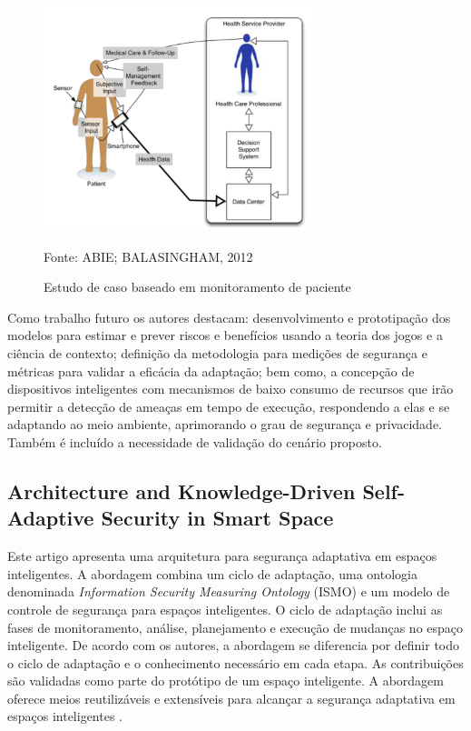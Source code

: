 \documentclass[tid,table]{texufpel} %
\begin{document}
\begin{figure}[ht]
\centering
\includegraphics[width=0.7\textwidth]{imagens/case-study-patient-monitoring.png}
\caption{Estudo de caso baseado em monitoramento de paciente}
\label{case-study-patient-monitoring}
Fonte: ABIE; BALASINGHAM, 2012
\end{figure}


Como trabalho futuro os autores destacam: desenvolvimento e prototipação dos modelos para estimar e prever riscos e benefícios usando a teoria dos jogos e a ciência de contexto; definição da metodologia para medições de segurança e métricas para validar a eficácia da adaptação; bem como, a concepção de dispositivos inteligentes com mecanismos de baixo consumo de recursos que irão permitir a detecção de ameaças em tempo de execução, respondendo a elas e se adaptando ao meio ambiente, aprimorando o grau de segurança e privacidade. Também é incluído a necessidade de validação do cenário proposto.



\subsection{Architecture and Knowledge-Driven Self-Adaptive Security in Smart Space} %

Este artigo apresenta uma arquitetura para segurança adaptativa em espaços inteligentes. A abordagem combina um ciclo de adaptação, uma ontologia denominada \textit{Information Security Measuring Ontology} (ISMO) e um modelo de controle de segurança para espaços inteligentes. O ciclo de adaptação inclui as fases de monitoramento, análise, planejamento e execução de mudanças no espaço inteligente. De acordo com os autores, a abordagem se diferencia por definir todo o ciclo de adaptação e o conhecimento necessário em cada etapa. As contribuições são validadas como parte do protótipo de um espaço inteligente. A abordagem oferece meios reutilizáveis e extensíveis para alcançar a segurança adaptativa em espaços inteligentes \cite{evesti13c}. 
\end{document}
